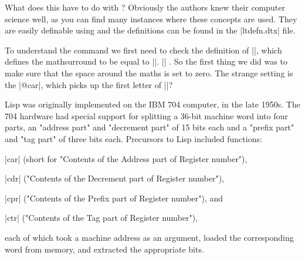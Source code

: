 What does this have to do with \latex? Obviously the \latex authors knew their computer science well, as you can find many instances where these concepts are used. They are easily definable using \tex and the definitions can be found in the |ltdefn.dtx| file.






\begin{teX}
\makeatletter
 \def\LaTeXe{%
   \mbox{\m@th%
    \if b\expandafter\@car\f@series\@nil\boldmath\fi
     \LaTeX\kern.15em2$_{\textstyle\varepsilon}$}}
\makeatother
\end{teX}

\scalebox{5}{\LaTeXe}

To understand the command we first need to check the definition of |\m@th|, which defines the mathsurround to be equal to |\z@|. |\def\m@th{\mathsurround\z@}| . So the first thing we did was to make sure that the space around the maths is set to zero. The strange setting is the |@car|, which picks up the first letter of |\boldmath|?

\makeatletter
\def\Latex{%
   \mbox{\m@th%
    \boldmath
     \LaTeX\kern.15em2$_{\textstyle\varepsilon}$}}
 

\makeatother

\scalebox{5}{\Latex}


Lisp was originally implemented on the IBM 704 computer, in the late 1950s. The 704 hardware had special support for splitting a 36-bit machine word into four parts, an "address part" and "decrement part" of 15 bits each and a "prefix part" and "tag part" of three bits each.
Precursors to Lisp included functions:

\begin{description}
\item{|car|} (short for "Contents of the Address part of Register number"),
\item{|cdr|} ("Contents of the Decrement part of Register number"),
\item{|cpr|} ("Contents of the Prefix part of Register number"), and
\item{|ctr|} ("Contents of the Tag part of Register number"),
\end{description}
each of which took a machine address as an argument, loaded the corresponding word from memory, and extracted the appropriate bits.












